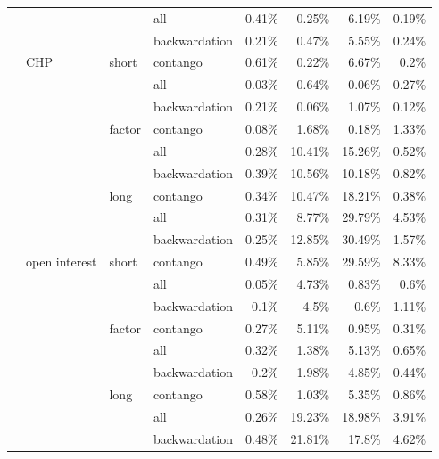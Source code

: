 \documentclass[]{elsarticle} %
\begin{document}
\begin{longtable}[t]{>{}llllrrrr}
\nopagebreak
 &  &  & all & 0.41\% & 0.25\% & 6.19\% & 0.19\%\\
\nopagebreak
 &  &  & backwardation & 0.21\% & 0.47\% & 5.55\% & 0.24\%\\
\nopagebreak
 & \multirow[t]{-9}{*}{\raggedright\arraybackslash CHP} & \multirow[t]{-3}{*}{\raggedright\arraybackslash short} & contango & 0.61\% & 0.22\% & 6.67\% & 0.2\%\\
\nopagebreak
 &  &  & all & 0.03\% & 0.64\% & 0.06\% & 0.27\%\\
\nopagebreak
 &  &  & backwardation & 0.21\% & 0.06\% & 1.07\% & 0.12\%\\
\nopagebreak
 &  & \multirow[t]{-3}{*}{\raggedright\arraybackslash factor} & contango & 0.08\% & 1.68\% & 0.18\% & 1.33\%\\
\nopagebreak
 &  &  & all & 0.28\% & 10.41\% & 15.26\% & 0.52\%\\
\nopagebreak
 &  &  & backwardation & 0.39\% & 10.56\% & 10.18\% & 0.82\%\\
\nopagebreak
 &  & \multirow[t]{-3}{*}{\raggedright\arraybackslash long} & contango & 0.34\% & 10.47\% & 18.21\% & 0.38\%\\
\nopagebreak
 &  &  & all & 0.31\% & 8.77\% & 29.79\% & 4.53\%\\
\nopagebreak
 &  &  & backwardation & 0.25\% & 12.85\% & 30.49\% & 1.57\%\\
\nopagebreak
 & \multirow[t]{-9}{*}{\raggedright\arraybackslash open interest} & \multirow[t]{-3}{*}{\raggedright\arraybackslash short} & contango & 0.49\% & 5.85\% & 29.59\% & 8.33\%\\
\nopagebreak
 &  &  & all & 0.05\% & 4.73\% & 0.83\% & 0.6\%\\
\nopagebreak
 &  &  & backwardation & 0.1\% & 4.5\% & 0.6\% & 1.11\%\\
\nopagebreak
 &  & \multirow[t]{-3}{*}{\raggedright\arraybackslash factor} & contango & 0.27\% & 5.11\% & 0.95\% & 0.31\%\\
\nopagebreak
 &  &  & all & 0.32\% & 1.38\% & 5.13\% & 0.65\%\\
\nopagebreak
 &  &  & backwardation & 0.2\% & 1.98\% & 4.85\% & 0.44\%\\
\nopagebreak
 &  & \multirow[t]{-3}{*}{\raggedright\arraybackslash long} & contango & 0.58\% & 1.03\% & 5.35\% & 0.86\%\\
\nopagebreak
 &  &  & all & 0.26\% & 19.23\% & 18.98\% & 3.91\%\\
\nopagebreak
 &  &  & backwardation & 0.48\% & 21.81\% & 17.8\% & 4.62\%\\

\end{longtable}
\end{document}
